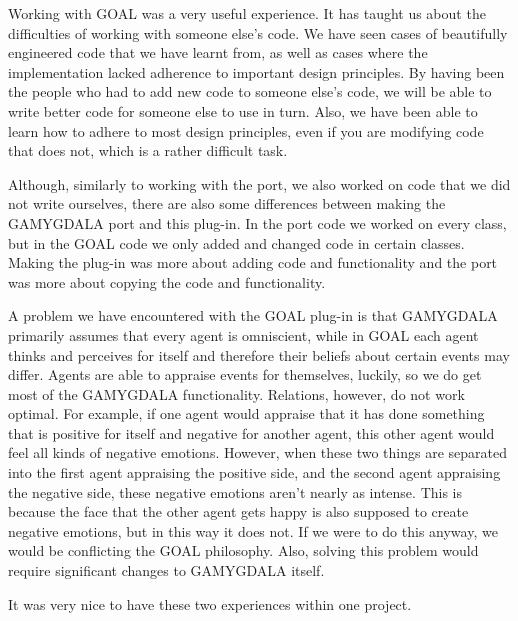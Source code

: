 Working with GOAL was a very useful experience. It has taught us about the difficulties of working with someone else's code. We have seen cases of beautifully engineered code that we have learnt from, as well as cases where the implementation lacked adherence to important design principles. By having been the people who had to add new code to someone else's code, we will be able to write better code for someone else to use in turn. Also, we have been able to learn how to adhere to most design principles, even if you are modifying code that does not, which is a rather difficult task.

Although, similarly to working with the port, we also worked on code that we did not write ourselves, there are also some differences between making the GAMYGDALA port and this plug-in. In the port code we worked on every class, but in the GOAL code we only added and changed code in certain classes. Making the plug-in was more about adding code and functionality and the port was more about copying the code and functionality.

A problem we have encountered with the GOAL plug-in is that GAMYGDALA primarily assumes that every agent is omniscient, while in GOAL each agent thinks and perceives for itself and therefore their beliefs about certain events may differ. Agents are able to appraise events for themselves, luckily, so we do get most of the GAMYGDALA functionality. Relations, however, do not work optimal. For example, if one agent would appraise that it has done something that is positive for itself and negative for another agent, this other agent would feel all kinds of negative emotions. However, when these two things are separated into the first agent appraising the positive side, and the second agent appraising the negative side, these negative emotions aren't nearly as intense. This is because the face that the other agent gets happy is also supposed to create negative emotions, but in this way it does not. If we were to do this anyway, we would be conflicting the GOAL philosophy. Also, solving this problem would require significant changes to GAMYGDALA itself.

It was very nice to have these two experiences within one project.


